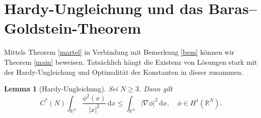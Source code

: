 \documentclass[11pt]{article}
\newtheorem{lem}[thm]{Lemma}
\theoremstyle{break}
\begin{document}
\section{Hardy-Ungleichung und das Baras--Goldstein-Theorem}
Mittels Theorem \ref{martel} in Verbindung mit Bemerkung \ref{bem} können wir Theorem  \ref{main} beweisen. Tatsächlich hängt die Existenz von Lösungen stark mit der Hardy-Ungleichung und Optimalität der Konstanten in dieser zusammen.
\begin{lem}[Hardy-Ungleichung]
Sei $N\ge 3$. Dann gilt
\begin{equation}\label{hardy}
C^*(N) \int_{\mathbb R^N} \frac{\phi^2(x)}{|x|^2}\, \mathrm dx \le \int_{\mathbb R^N} |\nabla \phi|^2\, \mathrm dx, \quad \phi \in H^1(\mathbb R^N).
\end{equation}
\end{lem}
\end{document}
